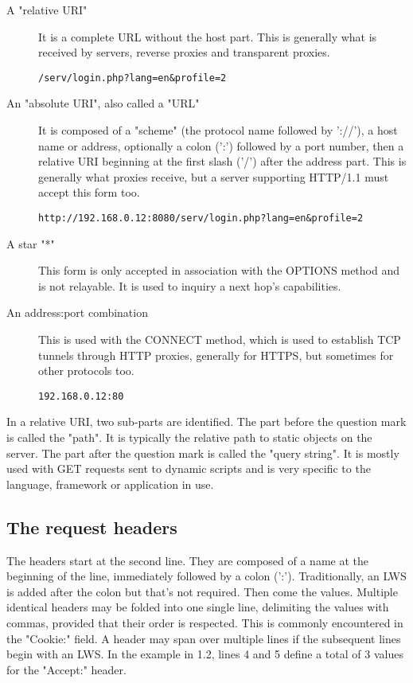 \begin{description}
\item[A "relative URI"]
    It is a complete URL without the host part. This is generally what is
    received by servers, reverse proxies and transparent proxies.
    
    \verb|/serv/login.php?lang=en&profile=2|

\item[An "absolute URI", also called a "URL"]
    It is composed of a "scheme" (the protocol name followed by '://'), a host
    name or address, optionally a colon (':') followed by a port number, then
    a relative URI beginning at the first slash ('/') after the address part.
    This is generally what proxies receive, but a server supporting HTTP/1.1
    must accept this form too.
    
    \verb|http://192.168.0.12:8080/serv/login.php?lang=en&profile=2|

\item[A star "*"]
    This form is only accepted in association with the OPTIONS
    method and is not relayable. It is used to inquiry a next hop's
    capabilities.

\item[An address:port combination]
    This is used with the CONNECT method, which is used to establish TCP
    tunnels through HTTP proxies, generally for HTTPS, but sometimes for
    other protocols too.
    
    \verb|192.168.0.12:80|
\end{description}

In a relative URI, two sub-parts are identified. The part before the question
mark is called the "path". It is typically the relative path to static objects
on the server. The part after the question mark is called the "query string".
It is mostly used with GET requests sent to dynamic scripts and is very
specific to the language, framework or application in use.

\subsection{The request headers}
The headers start at the second line. They are composed of a name at the
beginning of the line, immediately followed by a colon (':'). Traditionally,
an LWS is added after the colon but that's not required. Then come the values.
Multiple identical headers may be folded into one single line, delimiting the
values with commas, provided that their order is respected. This is commonly
encountered in the "Cookie:" field. A header may span over multiple lines if
the subsequent lines begin with an LWS. In the example in 1.2, lines 4 and 5
define a total of 3 values for the "Accept:" header.

